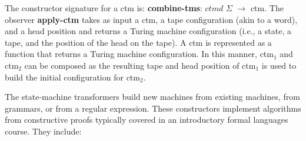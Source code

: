 \documentclass{eptcs}
\begin{document}
The constructor signature for a \textsf{ctm} is: \textbf{combine-tms}: $ctmd$ $\Sigma$ $\rightarrow$ \textsf{ctm}. The observer \textbf{apply-ctm} takes as input a \textsf{ctm}, a tape configuration (akin to a word), and a head position and returns a Turing machine configuration (i.e., a state, a tape, and the position of the head on the tape). A \textsf{ctm} is represented as a function that returns a Turing machine configuration. In this manner, \textsf{ctm}$_1$ and \textsf{ctm}$_2$ can be composed as the resulting tape and head position of \textsf{ctm}$_1$ is used to build the initial configuration for \textsf{ctm}$_2$.

The state-machine transformers build new machines from existing machines, from grammars, or from a regular expression. These constructors implement algorithms from constructive proofs typically covered in an introductory formal languages course. They include:
\end{document}
